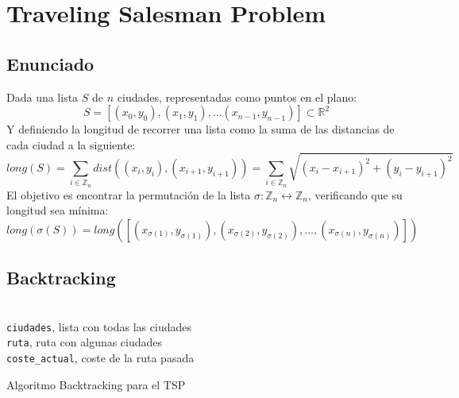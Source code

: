 \documentclass[a4paper, 11pt]{article} %
\begin{document}
\section{Traveling Salesman Problem}
  \subsection{Enunciado}
    Dada una lista $S$ de $n$ ciudades, representadas como puntos en el plano:
    \begin{equation}
      S = [(x_0,y_0), (x_1,y_1), \dots (x_{n-1},y_{n-1})] \subset \mathbb{R}^2
    \end{equation}
    Y definiendo la longitud de recorrer una lista como la suma de las distancias de cada ciudad a la siguiente:
    \begin{equation}
     long(S) = \sum_{i \in \mathbb{Z}_n} dist((x_i,y_i), (x_{i+1}, y_{i+1})) = \sum_{i \in \mathbb{Z}_n} \sqrt{(x_i-x_{i+1})^2 + (y_i-y_{i+1})^2}
    \end{equation}
    El objetivo es encontrar la permutación de la lista $\sigma : \mathbb{Z}_n \leftrightarrow \mathbb{Z}_n$, verificando que su longitud sea mínima:
    \begin{equation}
     long(\sigma(S)) = long([(x_{\sigma(1)},y_{\sigma(1)}), (x_{\sigma(2)},y_{\sigma(2)}), \dots, (x_{\sigma(n)},y_{\sigma(n)})])
    \end{equation}
    
  \subsection{Backtracking}
  \begin{algorithm}[H]
  	\begin{algorithmic}[1]
  		\REQUIRE \ \\
          \texttt{ciudades}, lista con todas las ciudades \\
          \texttt{ruta}, ruta con algunas ciudades \\
          \texttt{coste\_actual}, coste de la ruta pasada \\


	      \ENDIF
	    \ELSE
	      \ENDFOR
	    \ENDIF
  	\end{algorithmic}
      \caption{Algoritmo Backtracking para el TSP}
      \label{Back-TSP}
  \end{algorithm}
\end{document}
